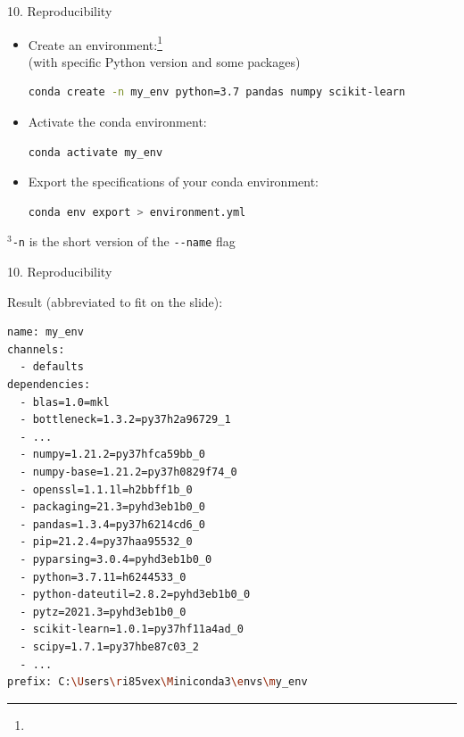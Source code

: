 \documentclass[11pt,compress,t,notes=noshow, xcolor=table]{beamer}
\begin{document}

\begin{vbframe}{10. Reproducibility}

\vfill

\begin{itemize}
	\item Create an environment:\footnote{}\\
  (with specific Python version and some packages)
\begin{lstlisting}[language=bash,basicstyle=\tiny\ttfamily]
conda create -n my_env python=3.7 pandas numpy scikit-learn
\end{lstlisting}
	\item Activate the conda environment:
\begin{lstlisting}[language=bash]
conda activate my_env
\end{lstlisting}
	\item Export the specifications of your conda environment:
\begin{lstlisting}[language=bash]
conda env export > environment.yml
\end{lstlisting}
\end{itemize}

\vfill

\footnotesize $^3$\texttt{-n} is the short version of the \mbox{\texttt{-}}\texttt{-name} flag

\end{vbframe}


\begin{vbframe}{10. Reproducibility}

\vfill

Result (abbreviated to fit on the slide):

\scriptsize

\begin{lstlisting}[language=bash,basicstyle=\tiny\ttfamily]
name: my_env
channels:
  - defaults
dependencies:
  - blas=1.0=mkl
  - bottleneck=1.3.2=py37h2a96729_1
  - ...
  - numpy=1.21.2=py37hfca59bb_0
  - numpy-base=1.21.2=py37h0829f74_0
  - openssl=1.1.1l=h2bbff1b_0
  - packaging=21.3=pyhd3eb1b0_0
  - pandas=1.3.4=py37h6214cd6_0
  - pip=21.2.4=py37haa95532_0
  - pyparsing=3.0.4=pyhd3eb1b0_0
  - python=3.7.11=h6244533_0
  - python-dateutil=2.8.2=pyhd3eb1b0_0
  - pytz=2021.3=pyhd3eb1b0_0
  - scikit-learn=1.0.1=py37hf11a4ad_0
  - scipy=1.7.1=py37hbe87c03_2
  - ...
prefix: C:\Users\ri85vex\Miniconda3\envs\my_env
\end{lstlisting}

\vfill

\end{vbframe}
\end{document}
